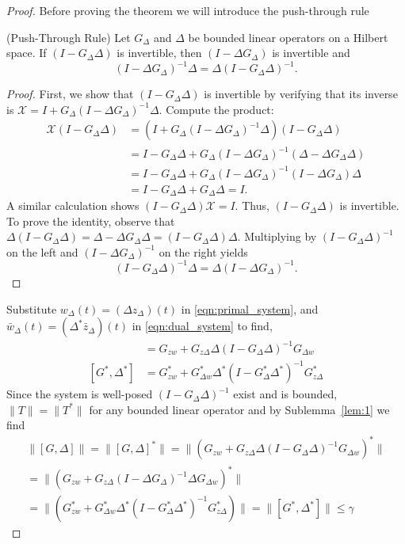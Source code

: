 \begin{proof}
Before proving the theorem we will introduce the push-through rule
\begin{sublemma}\label{lem:1} (Push-Through Rule)
Let \( G_\Delta \) and \( \Delta \) be bounded linear operators on a Hilbert space. If \( (I - G_\Delta \Delta) \) is invertible, then \( (I - \Delta G_\Delta) \) is invertible and
\[
(I - \Delta G_\Delta)^{-1} \Delta = \Delta (I - G_\Delta \Delta)^{-1}.
\]
\end{sublemma}

\begin{proof}
First, we show that \( (I - G_\Delta \Delta) \) is invertible by verifying that its inverse is \( \mathcal{X} = I + G_\Delta (I - \Delta G_\Delta)^{-1} \Delta \). Compute the product:
\begin{align*}
\mathcal{X} (I - G_\Delta \Delta) &= \left(I + G_\Delta (I - \Delta G_\Delta)^{-1} \Delta \right) (I - G_\Delta \Delta) \\
&= I - G_\Delta \Delta + G_\Delta (I - \Delta G_\Delta)^{-1} (\Delta - \Delta G_\Delta  \Delta) \\
&= I - G_\Delta \Delta + G_\Delta (I - \Delta G_\Delta)^{-1} (I - \Delta G_\Delta) \Delta \\
&= I - G_\Delta \Delta + G_\Delta \Delta = I.
\end{align*}
A similar calculation shows \( (I - G_\Delta \Delta) \mathcal{X} = I \). Thus, \( (I - G_\Delta \Delta) \) is invertible. To prove the identity, observe that \( \Delta (I - G_\Delta \Delta) = \Delta - \Delta G_\Delta \Delta = (I - G_\Delta \Delta) \Delta \). Multiplying by \( (I - G_\Delta \Delta)^{-1} \) on the left and \( (I - \Delta G_\Delta)^{-1} \) on the right yields
\[
(I - G_\Delta \Delta)^{-1} \Delta = \Delta (I - \Delta G_\Delta)^{-1}.
\]
\end{proof}
Substitute $w_\Delta(t) = (\Delta z_\Delta)(t)$ in \eqref{eqn:primal_system}, and $\bar{w}_\Delta(t) = (\Delta^* \bar{z}_\Delta)(t)$ in \eqref{eqn:dual_system} to find,
\begin{align*}
    [G,\Delta] &= G_{zw} + G_{z\Delta}\Delta(I-G_\Delta\Delta)^{-1}G_{\Delta w}\\
    [G^*, \Delta^*] &= G_{zw}^* + G_{\Delta w}^*\Delta^*(I-G_\Delta^*\Delta^*)^{-1}G_{z\Delta}^*
\end{align*}
\color{orange}Since the system is well-posed $(I-G_\Delta\Delta)^{-1}$ exist and is bounded, \color{black}$\|T\| = \|T^*\|$ for any bounded linear operator \cite[Thm 3.9]{kreyszig1991introductory} and by Sublemma~\ref{lem:1} we find
\begin{gather*}
    \|[G,\Delta]\| = \|[G,\Delta]^*\|= \|(G_{zw} + G_{z\Delta}\Delta(I-G_\Delta\Delta)^{-1}G_{\Delta w})^*\| \\= 
    \|(G_{zw} + G_{z\Delta}(I-\Delta G_\Delta)^{-1}\Delta G_{\Delta w})^*\|\\= \|(G_{zw}^* + G_{\Delta w}^*\Delta^*(I-G_\Delta^*\Delta^*)^{-1}G_{z\Delta}^*)\| = \|[G^*,\Delta^*]\|\leq\gamma
\end{gather*}
\end{proof}
